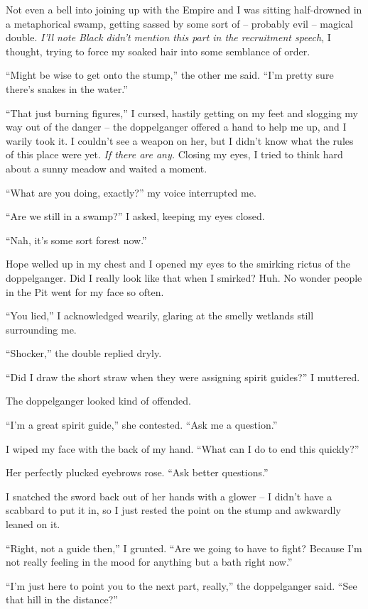\documentclass[12pt, openany]{book}
\begin{document}
Not even a bell into joining up with the Empire and I was sitting half-drowned in a metaphorical swamp, getting sassed by some sort of – probably evil – magical double. \textit{I’ll note Black didn’t mention this part in the recruitment speech}, I thought, trying to force my soaked hair into some semblance of order.

“Might be wise to get onto the stump,” the other me said. “I’m pretty sure there’s snakes in the water.”

“That just burning figures,” I cursed, hastily getting on my feet and slogging my way out of the danger – the doppelganger offered a hand to help me up, and I warily took it. I couldn’t see a weapon on her, but I didn’t know what the rules of this place were yet. \textit{If there are any.} Closing my eyes, I tried to think hard about a sunny meadow and waited a moment.

“What are you doing, exactly?” my voice interrupted me.

“Are we still in a swamp?” I asked, keeping my eyes closed.

“Nah, it’s some sort forest now.”

Hope welled up in my chest and I opened my eyes to the smirking rictus of the doppelganger. Did I really look like that when I smirked? Huh. No wonder people in the Pit went for my face so often.

“You lied,” I acknowledged wearily, glaring at the smelly wetlands still surrounding me.

“Shocker,” the double replied dryly.

“Did I draw the short straw when they were assigning spirit guides?” I muttered.

The doppelganger looked kind of offended.

“I’m a great spirit guide,” she contested. “Ask me a question.”

I wiped my face with the back of my hand. “What can I do to end this quickly?”

Her perfectly plucked eyebrows rose. “Ask better questions.”

I snatched the sword back out of her hands with a glower – I didn’t have a scabbard to put it in, so I just rested the point on the stump and awkwardly leaned on it.

“Right, not a guide then,” I grunted. “Are we going to have to fight? Because I’m not really feeling in the mood for anything but a bath right now.”

“I’m just here to point you to the next part, really,” the doppelganger said. “See that hill in the distance?”
\end{document}
